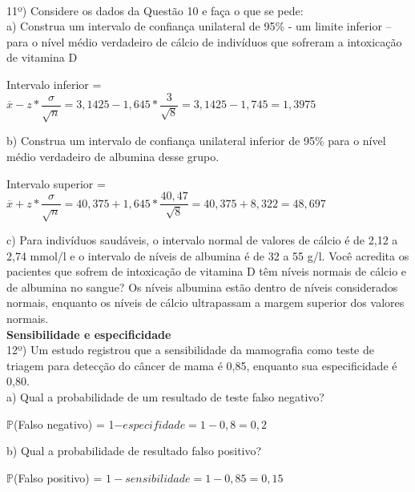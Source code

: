 \documentclass[12pt,a4paper]{article}
\begin{document}
	\vspace{1cm}\\
	11º) Considere os dados da Questão 10 e faça o que se pede:\\
	a) Construa um intervalo de confiança unilateral de 95\% - um limite inferior – para o nível médio verdadeiro de cálcio de indivíduos que sofreram a intoxicação de vitamina D\\
	\begin{center}
		Intervalo inferior = $\overline{x} - z*\dfrac{\sigma}{\sqrt{n}} = 3,1425 - 1,645*\dfrac{3}{\sqrt{8}} = 3,1425 - 1,745 = 1,3975$
	\end{center}
	\vspace{1cm}
	b) Construa um intervalo de confiança unilateral inferior de 95\% para o nível médio verdadeiro de albumina desse grupo.\\
		\begin{center}
		Intervalo superior = $\overline{x} + z*\dfrac{\sigma}{\sqrt{n}} = 40,375 + 1,645*\dfrac{40,47}{\sqrt{8}} = 40,375 + 8,322 = 48,697$
	\end{center}
	\vspace{1cm}
	c) Para indivíduos saudáveis, o intervalo normal de valores de cálcio é de 2,12 a 2,74 mmol/l e o intervalo de níveis de albumina é de 32 a 55 g/l. Você acredita os pacientes que
	sofrem de intoxicação de vitamina D têm níveis normais de cálcio e de albumina no	sangue?
	\vspace{0.5cm}
	Os níveis albumina estão dentro de níveis considerados normais, enquanto os níveis de cálcio ultrapassam a margem superior dos valores normais.
	\vspace{1cm}\\
	\textbf{Sensibilidade e especificidade}\\
	12º) Um estudo registrou que a sensibilidade da mamografia como teste de triagem para detecção do câncer de mama é 0,85, enquanto sua especificidade é 0,80.\\
	a) Qual a probabilidade de um resultado de teste falso negativo?\\
	\begin{center}
		$\mathbb{P}$(Falso negativo) = 1$ - especifidade = 1 - 0,8 = 0,2$
	\end{center}
	\vspace{1cm}
	b) Qual a probabilidade de resultado falso positivo?\\
		\begin{center}
		$\mathbb{P}$(Falso positivo) = $1 - sensibilidade = 1 - 0,85 = 0,15$
	\end{center}
\end{document}

